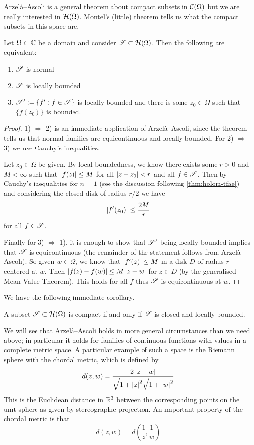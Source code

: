 Arzelà–Ascoli is a general theorem about compact subsets in $\mathcal{C}(\Omega)$ but we are really interested in $\mathcal{H}(\Omega)$. Montel's (little) theorem tells us what the compact subsets in this space are.
\begin{theorem} \label{thm:montel-thm}
    Let $\Omega \subset \mathbb{C}$ be a domain and consider $\mathscr{S} \subset \mathcal{H}(\Omega)$. Then the following are equivalent:
    \begin{enumerate}
        \item $\mathscr{S}$ is normal
        \item $\mathscr{S}$ is locally bounded
        \item $\mathscr{S}' := \{f' : f \in \mathscr{S}\}$ is locally bounded and there is some $z_0 \in \Omega$ such that $\{f(z_0)\}$ is bounded. 
    \end{enumerate}
\end{theorem}
\begin{proof}
    1) $\Rightarrow$ 2) is an immediate application of Arzelà–Ascoli, since the theorem tells us that normal families are equicontinuous and locally bounded. For 2) $\Rightarrow$ 3) we use Cauchy's inequalities.

    Let $z_0 \in \Omega$ be given. By local boundedness, we know there exists some $r > 0$ and $M < \infty$ such that $\left|f(z)\right| \leq M$ for all $\left|z - z_0\right| < r$ and all $f \in \mathscr{S}$. Then by Cauchy's inequalities for $n = 1$ (see the discussion following \autoref{thm:holom-tfae}) and considering the closed disk of radius $r/2$ we have 
    $$\left|f'(z_0)\right| \leq \frac{2M}{r}$$
    for all $f \in \mathscr{S}$.

    Finally for 3) $\Rightarrow$ 1), it is enough to show that $\mathscr{S}'$ being locally bounded implies that $\mathscr{S}$ is equicontinuous (the remainder of the statement follows from Arzelà–Ascoli). So given $w \in \Omega$, we know that $\left|f'(z)\right| \leq M$ in a disk $D$ of radius $r$ centered at $w$. Then $\left|f(z) - f(w)\right| \leq M\left|z - w\right|$ for $z \in D$ (by the generalised Mean Value Theorem). This holds for all $f$ thus $\mathscr{S}$ is equicontinuous at $w$. 
\end{proof}
We have the following immediate corollary.
\begin{corollary}
    A subset $\mathscr{S} \subset \mathcal{H}(\Omega)$ is compact if and only if $\mathscr{S}$ is closed and locally bounded.
\end{corollary}

We will see that Arzelà–Ascoli holds in more general circumstances than we need above; in particular it holds for families of continuous functions with values in a complete metric space. A particular example of such a space is the Riemann sphere with the chordal metric, which is defined by 
$$ d(z, w) = \frac{2 \left|z - w\right|}{\sqrt{1 + \left|z\right|^2} \sqrt{1 + \left|w\right|^2}} $$
This is the Euclidean distance in $\mathbb{R}^3$ between the corresponding points on the unit sphere as given by stereographic projection. An important property of the chordal metric is that 
$$d(z, w) = d \left( \frac{1}{z}, \frac{1}{w} \right)$$

